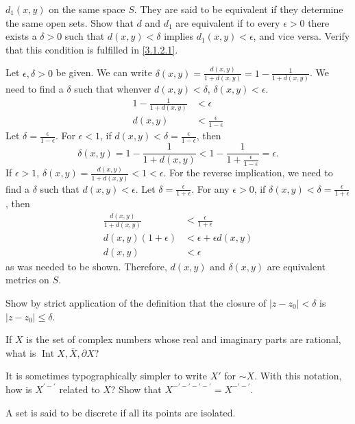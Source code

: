 \begin{exercise}[ref = \arabic{exercisei}]
  \(d_1(x,y)\) on the same space \(S\).
  They are said to be equivalent if they determine the same open sets.
  Show that \(d\) and \(d_1\) are equivalent if to every \(\epsilon > 0\) there
  exists a \(\delta > 0\) such that \(d(x,y) < \delta\) implies
  \(d_1(x,y) < \epsilon\), and vice versa.
  Verify that this condition is fulfilled in \cref{3.1.2.1}.
  \par\smallskip
  Let \(\epsilon,\delta > 0\) be given.
  We can write
  \(\delta(x,y) = \frac{d(x,y)}{1 + d(x,y)} = 1 - \frac{1}{1 + d(x,y)}\).
  We need to find a \(\delta\) such that whenver \(d(x,y) < \delta\),
  \(\delta(x,y) < \epsilon\).
  \begin{align*}
    1 - \frac{1}{1 + d(x, y)} & < \epsilon\\
    d(x, y) & < \frac{\epsilon}{1 - \epsilon}
  \end{align*}
  Let \(\delta = \frac{\epsilon}{1 - \epsilon}\).
  For \(\epsilon < 1\), if \(d(x,y) < \delta = \frac{\epsilon}{1 - \epsilon}\),
  then
  \[
  \delta(x,y) = 1 - \frac{1}{1 + d(x, y)} < 1 -
  \frac{1}{1 + \frac{\epsilon}{1 - \epsilon}} = \epsilon.
  \]
  If \(\epsilon > 1\),
  \(\delta(x,y) = \frac{d(x,y)}{1 + d(x,y)} < 1 < \epsilon\).
  For the reverse implication, we need to find a \(\delta\) such that
  \(d(x,y) < \epsilon\).
  Let \(\delta = \frac{\epsilon}{1 + \epsilon}\).
  For any \(\epsilon > 0\), if
  \(\delta(x,y) < \delta = \frac{\epsilon}{1 + \epsilon}\), then
  \begin{align*}
    \frac{d(x, y)}{1 + d(x, y)} & < \frac{\epsilon}{1 + \epsilon}\\
    d(x, y)(1 + \epsilon) & < \epsilon + \epsilon d(x, y)\\
    d(x, y) & < \epsilon
  \end{align*}
  as was needed to be shown.
  Therefore, \(d(x,y)\) and \(\delta(x,y)\) are equivalent metrics on \(S\).
\item
  Show by strict application of the definition that the closure of
  \(\lvert z - z_0\rvert < \delta\) is \(\lvert z - z_0\rvert\leq\delta\).
\item
  If \(X\) is the set of complex numbers whose real and imaginary parts are
  rational, what is \(\operatorname{Int} X, \bar{X}, \partial X\)?
\item
  It is sometimes typographically simpler to write \(X'\) for \(\sim X\).
  With this notation, how is \(X^{'-'}\) related to \(X\)?
  Show that \(X^{-'-'-'-'} = X^{-'-'}\).
\item
  A set is said to be discrete if all its points are isolated.

\end{exercise}
